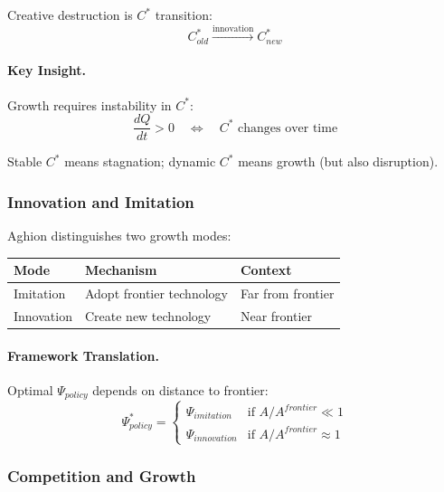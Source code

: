 Creative destruction is $C^*$ transition:
\begin{equation}
C^*_{old} \xrightarrow{\text{innovation}} C^*_{new}
\end{equation}

\paragraph{Key Insight.}
Growth requires instability in $C^*$:
\begin{equation}
\frac{dQ}{dt} > 0 \quad \Leftrightarrow \quad C^* \text{ changes over time}
\end{equation}

Stable $C^*$ means stagnation; dynamic $C^*$ means growth (but also disruption).

\subsubsection{Innovation and Imitation}

Aghion distinguishes two growth modes:

\begin{center}
\renewcommand{\arraystretch}{1.3}
\begin{tabular}{|l|l|l|}
\hline
\textbf{Mode} & \textbf{Mechanism} & \textbf{Context} \\
\hline
Imitation & Adopt frontier technology & Far from frontier \\
Innovation & Create new technology & Near frontier \\
\hline
\end{tabular}
\end{center}

\paragraph{Framework Translation.}
Optimal $\Psi_{policy}$ depends on distance to frontier:
\begin{equation}
\Psi^*_{policy} = 
\begin{cases}
\Psi_{imitation} & \text{if } A/A^{frontier} \ll 1 \\
\Psi_{innovation} & \text{if } A/A^{frontier} \approx 1
\end{cases}
\end{equation}

\subsubsection{Competition and Growth}

